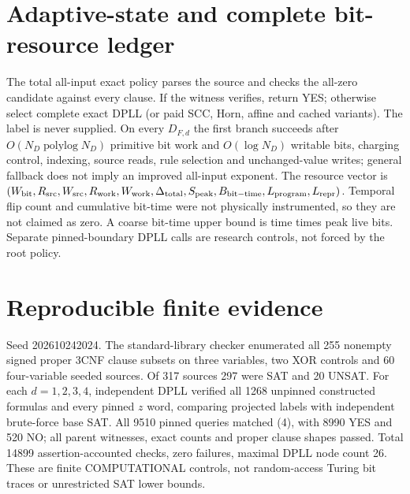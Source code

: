 \documentclass[11pt]{article}
\begin{document}
\section{Adaptive-state and complete bit-resource ledger}
The total all-input exact policy parses the source and checks the all-zero candidate against every clause. If the witness verifies, return YES; otherwise select complete exact DPLL (or paid SCC, Horn, affine and cached variants). The label is never supplied. On every $D_{F,d}$ the first branch succeeds after $O(N_D\operatorname{polylog}N_D)$ primitive bit work and $O(\log N_D)$ writable bits, charging control, indexing, source reads, rule selection and unchanged-value writes; general fallback does not imply an improved all-input exponent. The resource vector is $(W_{\rm bit},R_{\rm src},W_{\rm src},R_{\rm work},W_{\rm work},\Delta_{\rm total},S_{\rm peak},B_{\rm bit-time},L_{\rm program},L_{\rm repr})$. Temporal flip count and cumulative bit-time were not physically instrumented, so they are not claimed as zero. A coarse bit-time upper bound is time times peak live bits. Separate pinned-boundary DPLL calls are research controls, not forced by the root policy.
\section{Reproducible finite evidence}
Seed 202610242024. The standard-library checker enumerated all 255 nonempty signed proper 3CNF clause subsets on three variables, two XOR controls and 60 four-variable seeded sources. Of 317 sources 297 were SAT and 20 UNSAT. For each $d=1,2,3,4$, independent DPLL verified all 1268 unpinned constructed formulas and every pinned $z$ word, comparing projected labels with independent brute-force base SAT. All 9510 pinned queries matched (4), with 8990 YES and 520 NO; all parent witnesses, exact counts and proper clause shapes passed. Total 14899 assertion-accounted checks, zero failures, maximal DPLL node count 26. These are finite COMPUTATIONAL controls, not random-access Turing bit traces or unrestricted SAT lower bounds.
\end{document}
